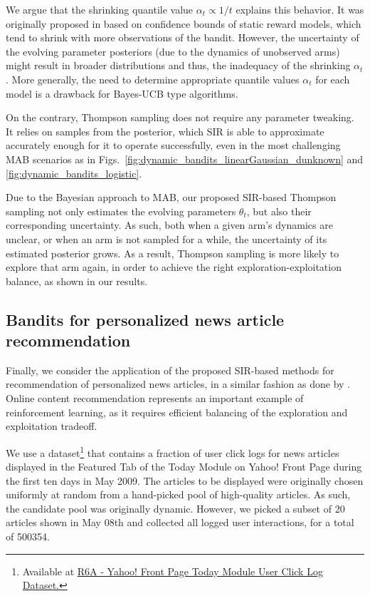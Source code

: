 \documentclass{article}
\begin{document}
We argue that the shrinking quantile value $\alpha_t\propto1/t$ explains this behavior. It was originally proposed in \cite{ip-Kaufmann2012} based on confidence bounds of static reward models, which tend to shrink with more observations of the bandit. However, the uncertainty of the evolving parameter posteriors (due to the dynamics of unobserved arms) might result in broader distributions and thus, the inadequacy of the shrinking $\alpha_t$. More generally, the need to determine appropriate quantile values $\alpha_t$ for each model is a drawback for Bayes-UCB type algorithms.

On the contrary, Thompson sampling does not require any parameter tweaking. It relies on samples from the posterior, which SIR is able to approximate accurately enough for it to operate successfully, even in the most challenging MAB scenarios as in Figs.~\ref{fig:dynamic_bandits_linearGaussian_dunknown} and \ref{fig:dynamic_bandits_logistic}.

\pagebreak
Due to the Bayesian approach to MAB, our proposed SIR-based Thompson sampling not only estimates the evolving parameters $\theta_t$, but also their corresponding uncertainty. As such, both when a given arm's dynamics are unclear, or when an arm is not sampled for a while, the uncertainty of its estimated posterior grows. As a result, Thompson sampling is more likely to explore that arm again, in order to achieve the right exploration-exploitation balance, as shown in our results.

\subsection{Bandits for personalized news article recommendation}
\label{ssec:logged_data_bandits}

Finally, we consider the application of the proposed SIR-based methods for recommendation of personalized news articles, in a similar fashion as done by \citet{ic-Chapelle2011}. Online content recommendation represents an important example of reinforcement learning, as it requires efficient balancing of the exploration and exploitation tradeoff.

We use a dataset\footnote{Available at \href{https://webscope.sandbox.yahoo.com/catalog.php?datatype=r\&did=49}{R6A - Yahoo! Front Page Today Module User Click Log Dataset.}} that contains a fraction of user click logs for news articles displayed in the Featured Tab of the Today Module on Yahoo! Front Page during the first ten days in May 2009. The articles to be displayed were originally chosen uniformly at random from a hand-picked pool of high-quality articles. As such, the candidate pool was originally dynamic. However, we picked a subset of 20 articles shown in May 08th and collected all logged user interactions, for a total of 500354.
\end{document}
